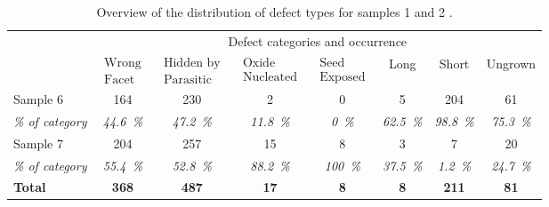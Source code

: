 \begin{table}
    \centering
    \caption[Overview of the distribution of defect types for samples 1 and 2.]{Overview of the distribution of defect types for samples 1 and 2 \cite{Brugnolotto2023_2}.}
    \begin{tabular}{l|ccccccc}
        \hline
         & \multicolumn{7}{c}{Defect categories and occurrence} \\ 
         & $\begin{matrix} \text{Wrong} \\ \text{Facet} \end{matrix}$ & $\begin{matrix} \text{Hidden by} \\ \text{Parasitic} \end{matrix}$ & $\begin{matrix} \text{Oxide} \\ \text{Nucleated} \end{matrix}$ & $\begin{matrix} \text{Seed} \\ \text{Exposed} \end{matrix}$ & Long & Short & Ungrown \\ 
        \hline \hline
        Sample 6 & \num{164} & \num{230} & \num{2} & \num{0} & \num{5} & \num{204} & \num{61} \\ 
        \textit{\% of category} & \textit{\qty{44.6}{\%}} & \textit{\qty{47.2}{\%}} & \textit{\qty{11.8}{\%}} & \textit{\qty{0}{\percent}} & \textit{\qty{62.5}{\%}} & \textit{\qty{98.8}{\%}} & \textit{\qty{75.3}{\%}} \\ 
        \hline
        Sample 7 & \num{204} & \num{257} & \num{15} & \num{8} & \num{3} & \num{7} & \num{20} \\ 
        \textit{\% of category} & \textit{\qty{55.4}{\%}} & \textit{\qty{52.8}{\%}} & \textit{\qty{88.2}{\%}} & \textit{\qty{100}{\%}} & \textit{\qty{37.5}{\%}} & \textit{\qty{1.2}{\%}} & \textit{\qty{24,7}{\%}} \\ 
        \hline
        \textbf{Total} & \textbf{\num{368}} & \textbf{\num{487}} & \textbf{\num{17}} & \textbf{\num{8}} & \textbf{\num{8}} & \textbf{\num{211}} & \textbf{\num{81}} \\
        \hline
    \end{tabular}
    \label{tab:defects}
\end{table}









